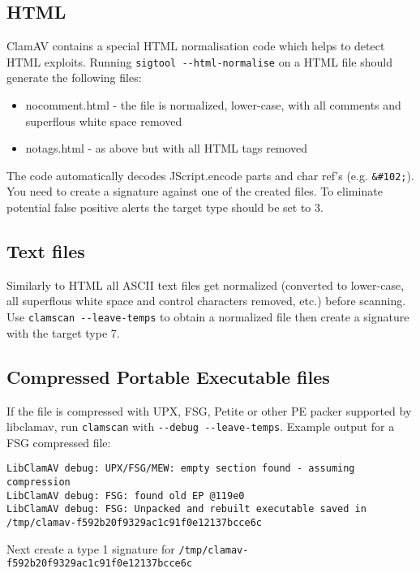 \documentclass[a4paper,titlepage,12pt]{article}
\begin{document}
    \subsection{HTML}
    ClamAV contains a special HTML normalisation code which helps to detect
    HTML exploits. Running \verb+sigtool --html-normalise+ on a HTML file
    should generate the following files:
    \begin{itemize}
	\item nocomment.html - the file is normalized, lower-case, with all
	comments and superflous white space removed
	\item notags.html - as above but with all HTML tags removed
    \end{itemize}
    The code automatically decodes JScript.encode parts and char ref's (e.g.
    \verb+&#102;+). You need to create a signature against one of the created
    files. To eliminate potential false positive alerts the target type should
    be set to 3.

    \subsection{Text files}
    Similarly to HTML all ASCII text files get normalized (converted
    to lower-case, all superflous white space and control characters removed,
    etc.) before scanning. Use \verb+clamscan --leave-temps+ to obtain
    a normalized file then create a signature with the target type 7.

    \subsection{Compressed Portable Executable files}
    If the file is compressed with UPX, FSG, Petite or other PE packer
    supported by libclamav, run \verb+clamscan+ with
    \verb+--debug --leave-temps+. Example output for a FSG compressed file:
    \begin{verbatim}
LibClamAV debug: UPX/FSG/MEW: empty section found - assuming compression
LibClamAV debug: FSG: found old EP @119e0
LibClamAV debug: FSG: Unpacked and rebuilt executable saved in
/tmp/clamav-f592b20f9329ac1c91f0e12137bcce6c
    \end{verbatim}
    Next create a type 1 signature for \verb+/tmp/clamav-f592b20f9329ac1c91f0e12137bcce6c+
\end{document}
